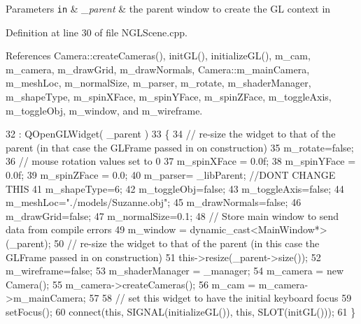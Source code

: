 \begin{DoxyParams}[1]{Parameters}
\mbox{\tt in}  & {\em \-\_\-parent} & the parent window to create the G\-L context in \\
\hline
\end{DoxyParams}


Definition at line 30 of file N\-G\-L\-Scene.\-cpp.



References Camera\-::create\-Cameras(), init\-G\-L(), initialize\-G\-L(), m\-\_\-cam, m\-\_\-camera, m\-\_\-draw\-Grid, m\-\_\-draw\-Normals, Camera\-::m\-\_\-main\-Camera, m\-\_\-mesh\-Loc, m\-\_\-normal\-Size, m\-\_\-parser, m\-\_\-rotate, m\-\_\-shader\-Manager, m\-\_\-shape\-Type, m\-\_\-spin\-X\-Face, m\-\_\-spin\-Y\-Face, m\-\_\-spin\-Z\-Face, m\-\_\-toggle\-Axis, m\-\_\-toggle\-Obj, m\-\_\-window, and m\-\_\-wireframe.


\begin{DoxyCode}
32   : QOpenGLWidget( \_parent )
33 \{
34   \textcolor{comment}{// re-size the widget to that of the parent (in that case the GLFrame passed in on construction)}
35   m_rotate=\textcolor{keyword}{false};
36   \textcolor{comment}{// mouse rotation values set to 0}
37   m_spinXFace = 0.0f;
38   m_spinYFace = 0.0f;
39   m_spinZFace = 0.0;
40   m_parser= \_libParent; \textcolor{comment}{//DONT CHANGE THIS}
41   m_shapeType=6;
42   m_toggleObj=\textcolor{keyword}{false};
43   m_toggleAxis=\textcolor{keyword}{false};
44   m_meshLoc=\textcolor{stringliteral}{"./models/Suzanne.obj"};
45   m_drawNormals=\textcolor{keyword}{false};
46   m_drawGrid=\textcolor{keyword}{false};
47   m_normalSize=0.1;
48   \textcolor{comment}{// Store main window to send data from compile errors}
49   m_window = \textcolor{keyword}{dynamic\_cast<}MainWindow*\textcolor{keyword}{>}(\_parent);
50   \textcolor{comment}{// re-size the widget to that of the parent (in this case the GLFrame passed in on construction)}
51   this->resize(\_parent->size());
52   m_wireframe=\textcolor{keyword}{false};
53   m_shaderManager = \_manager;
54   m_camera = \textcolor{keyword}{new} Camera();
55   m_camera->createCameras();
56   m_cam = m_camera->m_mainCamera;
57 
58   \textcolor{comment}{// set this widget to have the initial keyboard focus}
59   setFocus();
60   connect(\textcolor{keyword}{this}, SIGNAL(initializeGL()), \textcolor{keyword}{this}, SLOT(initGL()));
61 \}
\end{DoxyCode}


